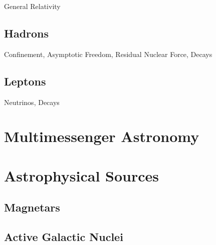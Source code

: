 General Relativity

\subsection*{Hadrons}
\label{sub:hadrons}

Confinement, Asymptotic Freedom, Residual Nuclear Force, Decays

\subsection*{Leptons}
\label{sub:leptons}

Neutrinos, Decays

\section{Multimessenger Astronomy}
\label{sec:multimessenger}

\section{Astrophysical Sources}
\label{sec:sources}

\subsection*{Magnetars}
\label{sub:magnetars}

\subsection*{Active Galactic Nuclei}
\label{sub:agn}

